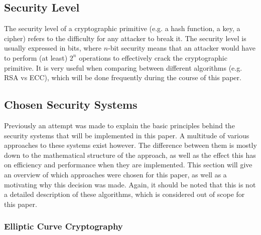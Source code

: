 \documentclass[11pt]{article}
\begin{document}
\subsection{Security Level}
\label{sec:security_level}

The security level of a cryptographic primitive (e.g. a hash function, a key, a cipher) refers to the difficulty for any attacker to break it. The security level is usually expressed in bits, where $n$-bit security means that an attacker would have to perform (at least) $2^n$ operations to effectively crack the cryptographic primitive. It is very useful when comparing between different algorithms (e.g. RSA vs ECC), which will be done frequently during the course of this paper.

\subsection{Chosen Security Systems}
Previously an attempt was made to explain the basic principles behind the security systems that will be implemented in this paper. A multitude of various approaches to these systems exist however. The difference between them is mostly down to the mathematical structure of the approach, as well as the effect this has on efficiency and performance when they are implemented. This section will give an overview of which approaches were chosen for this paper, as well as a motivating why this decision was made. Again, it should be noted that this is not a detailed description of these algorithms, which is considered out of scope for this paper.

\subsubsection{Elliptic Curve Cryptography}
\label{sec:ECC}
\end{document}
